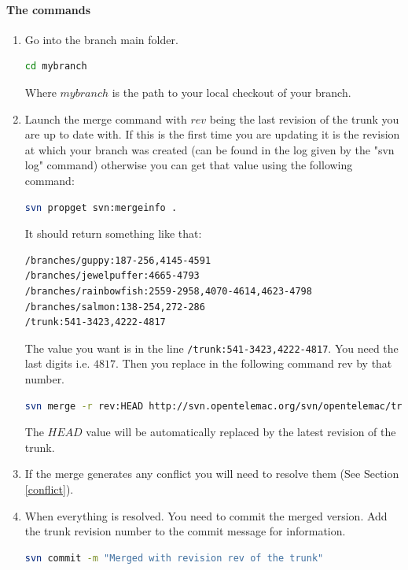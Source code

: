 \paragraph{The commands}
\begin{enumerate}
\item Go into the branch main folder.
\begin{lstlisting}[language=bash]
cd mybranch
\end{lstlisting}
Where $mybranch$ is the path to your local checkout of your branch.
\item Launch the merge command with $rev$ being the last revision of the trunk
you are up to date with. If this is the first time you are updating it is the
revision at which your branch was created (can be found in the log given by the
"svn log" command) otherwise you can get that value using the following
command:
\begin{lstlisting}[language=bash]
svn propget svn:mergeinfo .
\end{lstlisting}
It should return something like that:
\begin{lstlisting}[language=bash]
/branches/guppy:187-256,4145-4591
/branches/jewelpuffer:4665-4793
/branches/rainbowfish:2559-2958,4070-4614,4623-4798
/branches/salmon:138-254,272-286
/trunk:541-3423,4222-4817
\end{lstlisting}
The value you want is in the line \verb+/trunk:541-3423,4222-4817+. You need
the last digits i.e. $4817$.  Then you replace in the following command rev by
that number.
\begin{lstlisting}[language=bash]
svn merge -r rev:HEAD http://svn.opentelemac.org/svn/opentelemac/trunk .
\end{lstlisting}
The $HEAD$ value will be automatically replaced by the latest revision of the
trunk.
\item If the merge generates any conflict you will need to resolve them (See
Section \ref{conflict}).
\item When everything is resolved. You need to commit the merged version. Add
the trunk revision number to the commit message for information.
\begin{lstlisting}[language=bash]
svn commit -m "Merged with revision rev of the trunk"
\end{lstlisting}
\end{enumerate}
%
